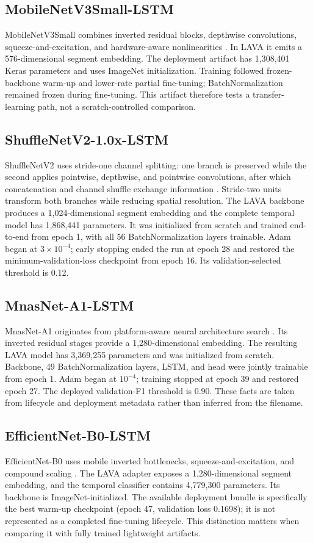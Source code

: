 \documentclass[10pt,journal]{IEEEtran}
\begin{document}
\subsection{MobileNetV3Small-LSTM}
MobileNetV3Small combines inverted residual blocks, depthwise convolutions, squeeze-and-excitation, and hardware-aware nonlinearities \cite{howard2019mobilenetv3,sandler2018mobilenetv2}. In LAVA it emits a 576-dimensional segment embedding. The deployment artifact has 1,308,401 Keras parameters and uses ImageNet initialization. Training followed frozen-backbone warm-up and lower-rate partial fine-tuning; BatchNormalization remained frozen during fine-tuning. This artifact therefore tests a transfer-learning path, not a scratch-controlled comparison.

\subsection{ShuffleNetV2-1.0x-LSTM}
ShuffleNetV2 uses stride-one channel splitting: one branch is preserved while the second applies pointwise, depthwise, and pointwise convolutions, after which concatenation and channel shuffle exchange information \cite{zhang2018shufflenet,ma2018shufflenetv2}. Stride-two units transform both branches while reducing spatial resolution. The LAVA backbone produces a 1,024-dimensional segment embedding and the complete temporal model has 1,868,441 parameters. It was initialized from scratch and trained end-to-end from epoch 1, with all 56 BatchNormalization layers trainable. Adam began at $3\times10^{-4}$; early stopping ended the run at epoch 28 and restored the minimum-validation-loss checkpoint from epoch 16. Its validation-selected threshold is 0.12.

\subsection{MnasNet-A1-LSTM}
MnasNet-A1 originates from platform-aware neural architecture search \cite{tan2019mnasnet}. Its inverted residual stages provide a 1,280-dimensional embedding. The resulting LAVA model has 3,369,255 parameters and was initialized from scratch. Backbone, 49 BatchNormalization layers, LSTM, and head were jointly trainable from epoch 1. Adam began at $10^{-4}$; training stopped at epoch 39 and restored epoch 27. The deployed validation-F1 threshold is 0.90. These facts are taken from lifecycle and deployment metadata rather than inferred from the filename.

\subsection{EfficientNet-B0-LSTM}
EfficientNet-B0 uses mobile inverted bottlenecks, squeeze-and-excitation, and compound scaling \cite{tan2019efficientnet}. The LAVA adapter exposes a 1,280-dimensional segment embedding, and the temporal classifier contains 4,779,300 parameters. Its backbone is ImageNet-initialized. The available deployment bundle is specifically the best warm-up checkpoint (epoch 47, validation loss 0.1698); it is not represented as a completed fine-tuning lifecycle. This distinction matters when comparing it with fully trained lightweight artifacts.
\end{document}
